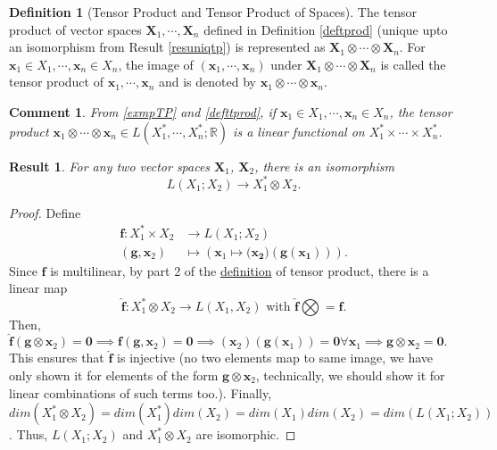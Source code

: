 \documentclass[letterpaper,12pt]{article}
\theoremstyle{plain}
\newtheorem{res}{Result}
\theoremstyle{plain}
\newtheorem*{cmnt*}{Comment}
\theoremstyle{definition}
\newtheorem{defn}{Definition}
\begin{document}
\begin{defn}[Tensor Product and Tensor Product of Spaces]\label{defttprod}
The tensor product of vector spaces $\mathbf{X}_1,\cdots,\mathbf{X}_n$ defined in Definition \ref{deftprod} (unique upto an isomorphism from Result \ref{resuniqtp}) is represented as $\mathbf{X}_1 \otimes \cdots \otimes \mathbf{X}_n$. For $\mathbf{x}_1\in X_1,\cdots,\mathbf{x}_n\in X_n$, the image of $(\mathbf{x}_1,\cdots,\mathbf{x}_n)$ under $\mathbf{X}_1 \otimes \cdots \otimes \mathbf{X}_n$ is called the tensor product of $\mathbf{x}_1,\cdots,\mathbf{x}_n$ and is denoted by $\mathbf{x}_1 \otimes \cdots \otimes \mathbf{x}_n$.
\end{defn}

\begin{cmnt*} From \autoref{exmpTP} and \autoref{defttprod}, if $\mathbf{x}_1\in X_1,\cdots,\mathbf{x}_n\in X_n$, the tensor product $\mathbf{x}_1 \otimes \cdots \otimes \mathbf{x}_n \in L(X_1^*,\cdots,X_n^*;\mathbb{R})$ is a linear functional on $X_1^*\times\cdots\times X_n^*$.
\end{cmnt*}

\begin{res} \label{resmptensr} For any two vector spaces $\mathbf{X}_1$, $\mathbf{X}_2$, there is an isomorphism
\[ L(X_1;X_2) \rightarrow X_1^* \otimes X_2.\]
\end{res}
\begin{proof}
Define
\begin{align*}
\mathbf{f}:X_1^*\times X_2 &\rightarrow L(X_1;X_2)\\
(\mathbf{g},\mathbf{x}_2) &\mapsto \left( \mathbf{x}_1 \mapsto (\mathbf{x_2)(\mathbf{g}(\mathbf{x}_1))}\right).
\end{align*}
Since $\mathbf{f}$ is multilinear, by part 2 of the \hyperref[deftprod]{definition} of tensor product, there is a linear map
\[ \hat{\mathbf{f}}:X_1^* \otimes X_2 \rightarrow L(X_1,X_2) \text{ with }\hat{\mathbf{f}}\bigotimes = \mathbf{f}. \]
Then, $\hat{\mathbf{f}}(\mathbf{g}\otimes \mathbf{x}_2) = \mathbf{0} \implies  \mathbf{f}(\mathbf{g}, \mathbf{x}_2) = \mathbf{0} \implies  (\mathbf{x}_2)(\mathbf{g}(\mathbf{x}_1)) = \mathbf{0} \forall \mathbf{x}_1 \implies \mathbf{g}\otimes \mathbf{x}_2 = \mathbf{0}.$ This ensures that $\hat{\mathbf{f}}$ is injective (no two elements map to same image, we have only shown it for elements of the form $\mathbf{g}\otimes \mathbf{x}_2$, technically, we should show it for linear combinations of such terms too.). Finally, $dim(X_1^*\otimes X_2) = dim(X_1^*)dim(X_2) = dim(X_1)dim(X_2) = dim(L(X_1;X_2))$. Thus, $L(X_1;X_2)$ and $X_1^* \otimes X_2$ are isomorphic.
\end{proof}
\end{document}
